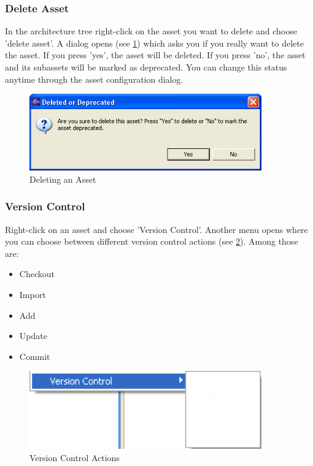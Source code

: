 \subsubsection{Delete Asset}
In the architecture tree right-click on the asset you want to delete and choose
'delete asset'. A dialog opens (see \ref{delete}) which asks you if you really want to delete the asset.
If you press 'yes', the asset will be deleted. If you press 'no', the asset and its
subassets will
be marked as deprecated. You can change this status anytime through the asset 
configuration dialog. 


\begin{figure}[h!]
\begin{center}
\includegraphics[width=10cm]{deleteasset.png}
   \caption{Deleting an Asset}
\label{delete}
\end{center}
\end{figure}\par

\subsubsection{Version Control}
Right-click on an asset and choose 'Version Control'. Another menu opens where you can choose
between different version control actions (see \ref{vcm}). Among those are:
\begin{itemize}
	\item Checkout
	\item Import
	\item Add
	\item Update
	\item Commit
\end{itemize}

\begin{figure}[h!]
\begin{center}
\includegraphics[width=10cm]{vcm.png}
   \caption{Version Control Actions}
\label{vcm}
\end{center}
\end{figure}\par





